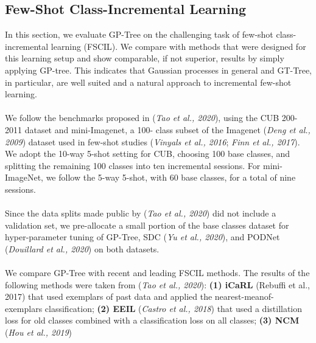 \documentclass[preprint,11pt]{elsarticle}
\begin{document}
        \subsection{Few-Shot Class-Incremental Learning}
        \label{sec:5.3}
        In this section, we evaluate GP-Tree on the challenging task
        of few-shot class-incremental learning (FSCIL). We compare
        with methods that were designed for this learning setup
        and show comparable, if not superior, results by simply
        applying GP-tree. This indicates that Gaussian processes
        in general and GT-Tree, in particular, are well suited and a
        natural approach to incremental few-shot learning.
        \\
        \\
        We follow the benchmarks proposed in (\textit{Tao et al., 2020}\cite{tao2020few}),
        using the CUB 200-2011 dataset and mini-Imagenet, a 100-
        class subset of the Imagenet (\textit{Deng et al., 2009}\cite{deng2009imagenet}) dataset used
        in few-shot studies (\textit{Vinyals et al., 2016}\cite{vinyals2016matching}; \textit{Finn et al., 2017}\cite{finn2017model}).
        We adopt the 10-way 5-shot setting for CUB, choosing 100
        base classes, and splitting the remaining 100 classes into
        ten incremental sessions. For mini-ImageNet, we follow
        the 5-way 5-shot, with 60 base classes, for a total of nine
        sessions.
        \\
        \\
        Since the data splits made public by (\textit{Tao et al., 2020}\cite{tao2020few}) did
        not include a validation set, we pre-allocate a small portion
        of the base classes dataset for hyper-parameter tuning of
        GP-Tree, SDC (\textit{Yu et al., 2020}\cite{yu2020semantic}), and PODNet (\textit{Douillard
        et al., 2020}\cite{douillard2020podnet}) on both datasets.
        \\
        \\
        We compare GP-Tree with recent and leading FSCIL methods.
        The results of the following methods were taken from
        (\textit{Tao et al., 2020}\cite{tao2020few}): \textbf{(1) iCaRL} (Rebuffi et al., 2017) that
        used exemplars of past data and applied the nearest-meanof-
        exemplars classification; \textbf{(2) EEIL} (\textit{Castro et al., 2018}\cite{castro2018end})
        that used a distillation loss for old classes combined with a
        classification loss on all classes; \textbf{(3) NCM} (\textit{Hou et al., 2019}\cite{hou2019learning})
\end{document}
